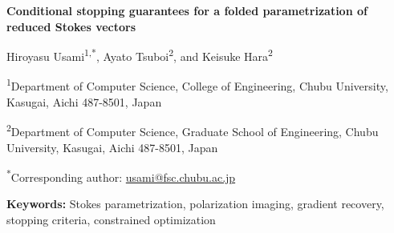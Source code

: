 \documentclass[10pt,a4paper]{article}
\begin{document}
\raggedright
\begin{center}
{\LARGE\bfseries Conditional stopping guarantees for a folded parametrization of reduced Stokes vectors\par}
\vspace{1em}
{\large Hiroyasu Usami\textsuperscript{1,*}, Ayato Tsuboi\textsuperscript{2}, and Keisuke Hara\textsuperscript{2}\par}
\vspace{0.6em}
{\small\textsuperscript{1}Department of Computer Science, College of Engineering, Chubu University, Kasugai, Aichi 487-8501, Japan\par}
{\small\textsuperscript{2}Department of Computer Science, Graduate School of Engineering, Chubu University, Kasugai, Aichi 487-8501, Japan\par}
\vspace{0.4em}
{\small\textsuperscript{*}Corresponding author: \href{mailto:usami@fsc.chubu.ac.jp}{usami@fsc.chubu.ac.jp}\par}
\end{center}
\begin{abstract}
Stopping decisions made in parametrization coordinates need not certify physically accurate estimates. We establish conditional stopping guarantees for a folded parametrization of reduced Stokes vectors, including partial linear polarization. For strongly convex physical objectives on the bounded-intensity inner sheet, normalized first derivatives and one radial lower-curvature test give an explicit objective-gap bound with sharp tolerance orders $\varepsilon^{4/3}+\nu^2$. The guarantee requires neither prior localization near an optimum nor a positive-semidefinite head Hessian. Its information basis is an exact recovery identity: one signed radial curvature restores the physical-gradient component lost at the fully linearly polarized fold, without stationarity or knowledge of the physical Hessian. For a nominal quadratic model, an outward-rounded implementation certifies a gap of at most $10^{-6}$ for 8,861 of 9,284 stored endpoints; it rejects all 295 historical false successes and 128 accurate endpoints. The full 128-fractional-bit pass takes 7.32 seconds and includes 52 scalar curvature evaluations. Controlled fits and released observations distinguish stopping certification from local fold diagnosis and subsequent coordinate repair. Twenty shared-network fits contain no saved near-fold negative-curvature candidates, and direct physical solvers are cheaper on the tested quadratics.
\end{abstract}
\noindent\textbf{Keywords:} Stokes parametrization, polarization imaging, gradient recovery, stopping criteria, constrained optimization
\end{document}
